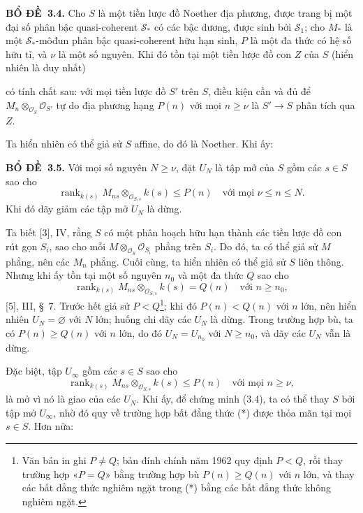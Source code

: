 \documentclass[11pt,twoside,openany]{book}
\numberwithin{equation}{section}
\newcommand{\src}[1]{%
  \phantomsection\hypertarget{src:\fgasourceid:#1}{}%
  \marginpar{\raggedleft\footnotesize\sffamily #1}%
}
\newcommand{\fgasourceid}{unset}
\newcommand{\result}[2]{\par\medskip\noindent\textbf{#1\if\relax\detokenize{#2}\relax\else\ #2\fi.}\quad}
\begin{document}
\result{BỔ ĐỀ}{3.4} Cho $S$ là một tiền lược đồ Noether địa phương, được trang
bị một đại số phân bậc quasi-coherent $\mathcal S_*$ có các bậc dương, được
sinh bởi $\mathcal S_1$; cho $M_*$ là một $\mathcal S_*$-môđun phân bậc quasi-coherent
hữu hạn sinh, $P$ là một đa thức có hệ số hữu tỉ, và $\nu$ là một số nguyên.
Khi đó tồn tại một tiền lược đồ con $Z$ của $S$ (hiển nhiên là duy nhất)
\src{263}
có tính chất sau: với mọi tiền lược đồ $S'$ trên $S$, điều kiện cần và đủ để
$M_n\otimes_{\mathcal O_S}\mathcal O_{S'}$ tự do địa phương hạng $P(n)$ với
mọi $n\geq\nu$ là $S'\longrightarrow S$ phân tích qua $Z$.

Ta hiển nhiên có thể giả sử $S$ affine, do đó là Noether. Khi ấy:

\result{BỔ ĐỀ}{3.5} Với mọi số nguyên $N\geq\nu$, đặt $U_N$ là tập mở của $S$
gồm các $s\in S$ sao cho
\[
\operatorname{rank}_{k(s)}
M_{ns}\otimes_{\mathcal O_{S,s}}k(s)\leq P(n)
\quad\text{với mọi $\nu\leq n\leq N$}.
\]
Khi đó dãy giảm các tập mở $U_N$ là dừng.

Ta biết [3], IV, rằng $S$ có một phân hoạch hữu hạn thành các tiền lược đồ con
rút gọn $S_i$, sao cho mỗi $M\otimes_{\mathcal O_S}\mathcal O_{S_i}$ phẳng
trên $S_i$. Do đó, ta có thể giả sử $M$ phẳng, nên các $M_n$ phẳng. Cuối cùng,
ta hiển nhiên có thể giả sử $S$ liên thông. Nhưng khi ấy tồn tại một số nguyên
$n_0$ và một đa thức $Q$ sao cho
\[
\operatorname{rank}_{k(s)}
M_{ns}\otimes_{\mathcal O_{S,s}}k(s)=Q(n)
\quad\text{với $n\geq n_0$},
\]
[5], III, \S~7. Trước hết giả sử $P<Q$\footnote{Văn bản in ghi
$P\neq Q$; bản đính chính năm 1962 quy định $P<Q$, rồi thay trường hợp
«$P=Q$» bằng trường hợp bù $P(n)\geq Q(n)$ với $n$ lớn, và thay các bất đẳng
thức nghiêm ngặt trong (*) bằng các bất đẳng thức không nghiêm ngặt.}; khi đó
$P(n)<Q(n)$ với $n$ lớn, nên hiển nhiên $U_N=\varnothing$ với $N$ lớn; huống
chi dãy các $U_N$ là dừng. Trong trường hợp bù, ta có
$P(n)\geq Q(n)$ với $n$ lớn, do đó $U_N=U_{n_0}$ với $N\geq n_0$, và dãy các
$U_N$ vẫn là dừng.

Đặc biệt, tập $U_\infty$ gồm các $s\in S$ sao cho
\[
\tag{*}
\operatorname{rank}_{k(s)}
M_{ns}\otimes_{\mathcal O_{S,s}}k(s)\leq P(n)
\quad\text{với mọi $n\geq\nu$},
\]
là mở vì nó là giao của các $U_N$. Khi ấy, để chứng minh (3.4), ta có thể thay
$S$ bởi tập mở $U_\infty$, nhờ đó quy về trường hợp bất đẳng thức (*) được
thỏa mãn tại mọi $s\in S$. Hơn nữa:
\end{document}
